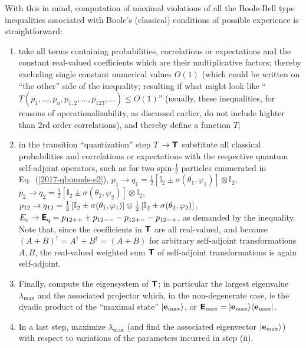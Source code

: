 \documentclass[%
  twocolumn,
 showpacs,
 showkeys,
 preprintnumbers,
 amsmath,amssymb,
 aps,
  pra,
  longbibliography,
 floatfix,
 ]{revtex4-1}
\begin{document}
With this in mind, computation of maximal violations of all the Boole-Bell type inequalities associated with
 Boole's  (classical) conditions of possible experience
is straightforward:
\begin{enumerate}

\item   take all terms containing probabilities, correlations or expectations
and the constant real-valued coefficients which are their
multiplicative factors;
thereby excluding single constant numerical values $O(1)$
(which could be written on ``the other'' side of the inequality; resulting if what might look like
``$T(p_1,\ldots,p_n, p_{1,2},\ldots,p_{123}, \ldots) \le O(1)$'' (usually, these inequalities,
for reasons of operationalizability, as discussed earlier, do not include highter than 2rd order correlations),
and thereby define a function $T$;
\item
in the transition ``quantization'' step $T \rightarrow \textsf{\textbf{T}}$
substitute all classical probabilities and correlations or expectations with the respective quantum
self-adjoint operators, such as for two spin-$\frac{1}{2}$ particles enumerated in Eq.~(\ref{2017-qbounds-e2}),
$p_1  \rightarrow  q_1
=
{\frac{1}{2}}\left[\mathbb{I}_2 \pm {\sigma}( \theta_1,\varphi_1)\right]\otimes  \mathbb{I}_2$,
$p_2  \rightarrow  q_2
=
{\frac{1}{2}}\left[\mathbb{I}_2 \pm {\sigma}( \theta_2,\varphi_2)\right]\otimes  \mathbb{I}_2$,
$p_{12} \rightarrow  q_{12}   =
{\frac{1}{2}}\left[\mathbb{I}_2 \pm {\bf \sigma}( \theta_1,\varphi_1)\right]
\otimes
{\frac{1}{2}}\left[\mathbb{I}_2 \pm {\bf \sigma}(  \theta_2,\varphi_2)\right]
$,
$
E_{\text{c}} \rightarrow
\textsf{\textbf{E}}_{\text{q}} =  p_{12++}+ p_{12--}  -p_{12+-} -p_{12-+}
$,
as demanded by the inequality.
Note that, since the coefficients in $\textsf{\textbf{T}}$ are all real-valued, and
because $(A+B)^\dagger =A^\dagger +B^\dagger = (A+B)$ for arbitrary self-adjoint transformations $A,B$,
the real-valued weighted sum $\textsf{\textbf{T}}$ of self-adjoint transformations is again self-adjoint.

\item
Finally, compute the eigensystem of $\textsf{\textbf{T}}$; in particular the
largest eigenvalue  $\lambda_{\text{max}}$ and the associated projector
which, in the non-degenerate case, is the dyadic product of the ``maximal state''
$\vert {\bf e}_{\text{max}} \rangle$, or
$\textsf{\textbf{E}}_{\text{max}} = \vert {\bf e}_{\text{max}} \rangle \langle  {\bf e}_{\text{max}} \vert $.

\item
In a last step, maximize $\lambda_{\text{max}}$
(and find the associated eigenvector $\vert {\bf e}_{\text{max}} \rangle$)
with respect to variations of the parameters incurred in step (ii).
\end{enumerate}
\end{document}
